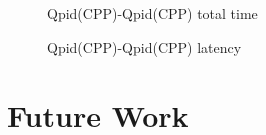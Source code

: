 \documentclass{thesis}
\begin{document}
\begin{figure}[tb] 
\centering
\caption{Qpid(CPP)-Qpid(CPP) total time}
\label{qpid-qpid-total-time}
\end{figure}

\begin{figure}[tb] 
\centering
\caption{Qpid(CPP)-Qpid(CPP) latency}
\label{qpid-qpid-latency}
\end{figure}

\chapter{Future Work}
\end{document}
